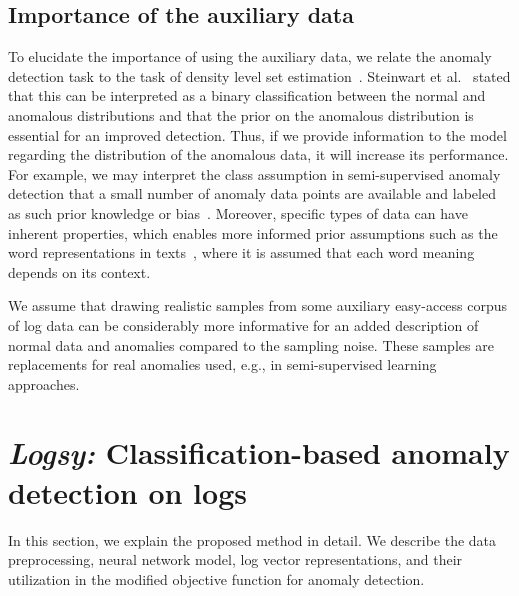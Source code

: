 \subsection{Importance of the auxiliary data}
To elucidate the importance of using the auxiliary data, we relate the anomaly detection task to 
the task of density level set estimation~\cite{tsybakov1997nonparametric}. Steinwart et al.~\cite{steinwart2005classification} stated that this can be interpreted as a binary classification between the normal and anomalous distributions and that the prior on the anomalous distribution is essential for an improved detection. Thus, if we provide information to the model regarding the distribution of the anomalous data, it will increase its performance. For example, we may interpret the class assumption in semi-supervised anomaly detection that a small number of anomaly data points are available and labeled as such prior knowledge or bias~\cite{ruff2019deep}. Moreover, specific types of data can have inherent properties, which enables more informed prior assumptions such as the word representations in texts~\cite{bengio2013representation}, where it is assumed that each word meaning depends on its context.

We assume that drawing realistic samples from some auxiliary easy-access corpus of log data can be considerably more informative for an added description of normal data and anomalies compared to the sampling noise. These samples are replacements for real anomalies used, e.g., in semi-supervised learning approaches.

\section{\textit{Logsy:} Classification-based anomaly detection on logs}
In this section, we explain the proposed method in detail. We describe the data preprocessing, neural network model, log vector representations, and their utilization in the modified objective function for anomaly detection.

